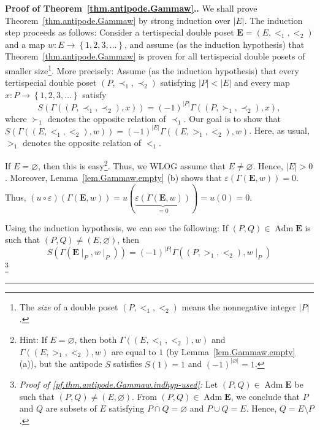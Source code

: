 \documentclass[numbers=enddot,12pt,final,onecolumn,notitlepage,abstracton]{scrartcl}
\theoremstyle{definition}
\newenvironment{proof}[1][Proof]{\noindent\textbf{#1.} }{\ \rule{0.5em}{0.5em}}
\newenvironment{verlong}{}{}
\newcommand{\Adm}{\operatorname{Adm}}
\newcommand{\EE}{{\mathbf{E}}}
\begin{document}
\begin{proof}[Proof of Theorem~\ref{thm.antipode.Gammaw}.]
We shall
prove Theorem~\ref{thm.antipode.Gammaw} by strong induction over
$\left|E\right|$. The induction step proceeds as follows: Consider a
tertispecial double poset $\EE = \left(E, <_1, <_2\right)$ and
a map $w : E \to \left\{1, 2, 3, \ldots\right\}$, and
assume (as the induction hypothesis)
that Theorem~\ref{thm.antipode.Gammaw} is proven for all
tertispecial double posets of smaller size\footnote{The
\textit{size} of a double poset $\left(P, <_1, <_2\right)$
means the nonnegative integer $\left|P\right|$.}.
\begin{verlong}
More precisely:
Assume (as the induction hypothesis) that every tertispecial
double poset $\left(P, \prec_1, \prec_2\right)$ satisfying
$\left|P\right| < \left|E\right|$ and every map
$x : P \to \left\{1, 2, 3, \ldots\right\}$ satisfy
\begin{equation}
S\left(\Gamma\left(\left(P, \prec_1, \prec_2\right), x\right)\right)
= \left(-1\right)^{\left|P\right|}
\Gamma\left(\left(P, \succ_1, \prec_2\right), x\right) ,
\label{pf.thm.antipode.Gammaw.indhyp}
\end{equation}
where $\succ_1$ denotes the opposite relation of $\prec_1$.
\end{verlong}
Our goal is to show that \newline
$S\left(\Gamma\left(\left(E, <_1, <_2\right), w\right) \right)
= \left(-1\right)^{\left|E\right|}
\Gamma\left(\left(E, >_1, <_2\right), w\right)$.
Here, as usual, $>_1$ denotes the opposite relation of $<_1$.

If $E = \varnothing$, then this is easy\footnote{Hint:
If $E = \varnothing$, then both
$\Gamma\left(\left(E, <_1, <_2\right), w\right)$ and
$\Gamma\left(\left(E, >_1, <_2\right), w\right)$ are equal
to $1$ (by Lemma~\ref{lem.Gammaw.empty} (a)),
but the antipode $S$ satisfies $S\left(1\right) = 1$
and $\left(-1\right)^{\left|\varnothing\right|} = 1$.}.
Thus, we WLOG assume that $E \neq \varnothing$. Hence,
$\left| E \right| > 0$. Moreover,
Lemma~\ref{lem.Gammaw.empty} (b) shows that
$\varepsilon \left( \Gamma\left(\EE, w\right) \right) = 0$. Thus,
$\left( u \circ \varepsilon \right) \left( \Gamma \left( \EE, w \right) \right)
= u \left( \underbrace{\varepsilon \left( \Gamma \left( \EE, w \right) \right)}_{= 0} \right)
= u \left( 0 \right) = 0$.

\begin{verlong}
Using the induction hypothesis, we can see the following:
If $\left(P, Q\right) \in \Adm \EE$ is such that
$\left(P, Q\right) \neq \left(E, \varnothing\right)$,
then
\begin{equation}
S\left(\Gamma\left(\EE\mid_P, w\mid_P\right)\right)
= \left(-1\right)^{\left|P\right|}
\Gamma\left(\left(P, >_1, <_2\right), w\mid_P\right)
\label{pf.thm.antipode.Gammaw.indhyp-used}
\end{equation}
\footnote{\textit{Proof of
\eqref{pf.thm.antipode.Gammaw.indhyp-used}:}
Let $\left(P, Q\right) \in \Adm \EE$ be such that
$\left(P, Q\right) \neq \left(E, \varnothing\right)$.
From $\left(P, Q\right) \in \Adm \EE$, we conclude
that $P$ and $Q$ are subsets of $E$ satisfying
$P \cap Q = \varnothing$ and $P \cup Q = E$.
Hence, $Q = E \setminus P$.

}
\end{verlong}
\end{proof}
\end{document}
